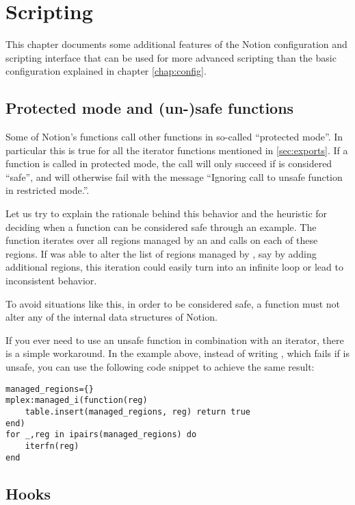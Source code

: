 
\chapter{Scripting}
\label{chap:tricks}

This chapter documents some additional features of the Notion configuration
and scripting interface that can be used for more advanced scripting than
the basic configuration explained in chapter \ref{chap:config}.


\section{Protected mode and (un-)safe functions}

Some of Notion's functions call other functions in so-called ``protected mode''.  
In particular this is true for all the iterator functions mentioned in 
\ref{sec:exports}. If a function  is called in protected mode, the call
will only succeed if  is considered ``safe'', and will otherwise fail 
with the message ``Ignoring call to unsafe function  in restricted 
mode.''.

Let us try to explain the rationale behind this behavior and the heuristic for 
deciding when a function can be considered safe through an example. The function 
 iterates over all regions managed by an  and 
calls  on each of these regions. If  was able to alter 
the list of regions managed by , say by adding additional regions, 
this iteration could easily turn into an infinite loop or lead to inconsistent 
behavior.

To avoid situations like this, in order to be considered safe, a function must
not alter any of the internal data structures of Notion.

If you ever need to use an unsafe function in combination with an iterator, 
there is a simple workaround. In the example above, instead of writing 
, which fails if  is 
unsafe, you can use the following code snippet to achieve the same result:
\begin{verbatim}
managed_regions={}
mplex:managed_i(function(reg)
    table.insert(managed_regions, reg) return true
end)
for _,reg in ipairs(managed_regions) do
    iterfn(reg)
end
\end{verbatim}


\section{Hooks}
\label{sec:hooks}

